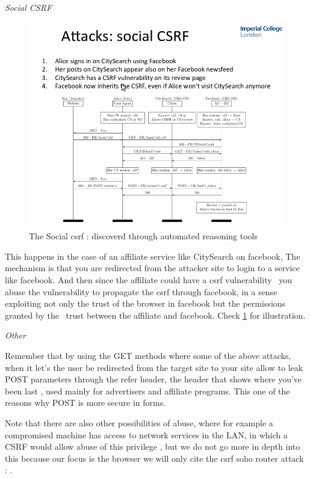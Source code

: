 \documentclass[a4paper,12pt]{paper}
\begin{document}
\emph{Social CSRF}

\begin{figure}[H]
\centering
\includegraphics[width=1\textwidth]{./socialcsrf.png}
\caption{\label{fig:socialcsrf}The Social csrf : discoverd through automated reasoning tools }
\end{figure}
This happens in the case of an affiliate service like CitySearch on facebook, 
The mechanism is that you are redirected from the attacker site to login to a service like facebook. And then since the affiliate could have a csrf vulnerability \
you abuse the vulnerability to propagate the csrf through facebook, in a sense exploiting not only the trust of the browser in facebook but the permissions granted by the \
trust between the affiliate and facebook. Check \ref{fig:socialcsrf} for illustration.

\emph{Other}

Remember that by using the GET methods where some of the above attacks, when it let's the user be redirected from the target site to your site allow to leak POST parameters through the 
refer header, the header that shows where you've been last , used mainly for advertisers and affiliate programs. This one of the reasons why POST is more secure in forms.

Note that there are also other possibilities of abuse, where for example a compromised machine has access to network services in the LAN, in which a CSRF would allow abuse
of this privilege , but we do not go more in depth into this because our focus is the browser we will only cite the csrf soho router attack : \cite{soho}.
\end{document}
